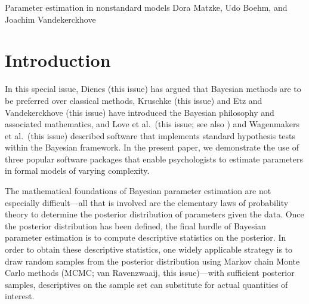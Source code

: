 {Parameter estimation in nonstandard models}
{Dora Matzke, Udo Boehm, and Joachim Vandekerckhove}

\newcommand{\file}[1]{{\texttt{#1}}}
\newcommand{\osf}{\url{https://osf.io/ucmaz/}}

\section{Introduction}
In this special issue, Dienes (this issue) has argued that Bayesian methods are to be preferred over classical methods, Kruschke (this issue) and Etz and Vandekerckhove (this issue) have introduced the Bayesian philosophy and associated mathematics, and Love et al.\ (this issue; see also ) and Wagenmakers et al.\ (this issue) described software that implements standard hypothesis tests within the Bayesian framework. In the present paper, we demonstrate the use of three popular software packages that enable psychologists to estimate parameters in formal models of varying complexity.

The mathematical foundations of Bayesian parameter estimation are not especially difficult---all that is involved are the elementary laws of probability theory to determine the posterior distribution of parameters given the data. Once the posterior distribution has been defined, the final hurdle of Bayesian parameter estimation is to compute descriptive statistics on the posterior. In order to obtain these descriptive statistics, one widely applicable strategy is to draw random samples from the posterior distribution using Markov chain Monte Carlo methods (MCMC; van Ravenzwaaij, this issue)---with sufficient posterior samples, descriptives on the sample set can substitute for actual quantities of interest.

